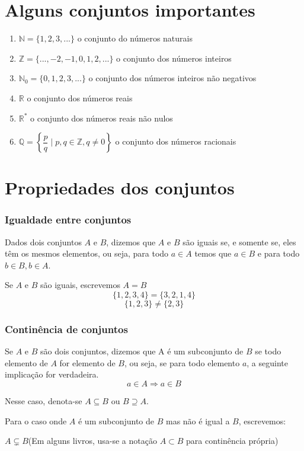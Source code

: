 \section{Alguns conjuntos importantes}
\begin{enumerate}
\item $\mathbb{N}=\{1,2,3,...\}$ o conjunto do n{\'u}meros naturais
\item $\mathbb{Z}=\{...,-2,-1,0,1,2,...\}$ o conjunto dos n{\'u}meros inteiros
\item $\mathbb{N}_{0}=\{0,1,2,3,...\}$ o conjunto dos n{\'u}meros inteiros n{\~a}o negativos
\item $\mathbb{R}$ o conjunto dos n{\'u}meros reais
\item $\mathbb{R}^{*}$ o conjunto dos n{\'u}meros reais n{\~a}o nulos
\item $\mathbb{Q}=\left\{\dfrac{p}{q} \mid p,q \in \mathbb{Z}, q \neq 0 \right\}$ o conjunto dos n{\'u}meros racionais
\end{enumerate}

\section{Propriedades dos conjuntos}

\subsubsection{Igualdade entre conjuntos}

Dados dois conjuntos $A$ e $B$, dizemos que $A$ e $B$ s{\~a}o iguais se, e somente se, eles t{\^e}m os mesmos elementos, ou seja, para todo $a\in A$ temos que $a\in B$ e para todo $b\in B,b\in A$.

Se $A$ e $B$ s{\~a}o iguais, escrevemos $A = B$
\[ \{1,2,3,4\} = \{3,2,1,4\} \]
\[ \{1,2,3\} \neq \{2,3\} \]

\subsubsection{Contin{\^e}ncia de conjuntos}

Se $A$ e $B$ s{\~a}o dois conjuntos, dizemos que A {\'e} um subconjunto de $B$ se todo elemento de $A$ for elemento de $B$, ou seja, se para todo elemento $a$, a seguinte implica{\c c}{\~a}o for verdadeira.
\[ a \in A \Rightarrow a \in B\]

Nesse caso, denota-se $A \subseteq B$ ou $B \supseteq A$.

Para o caso onde $A$ {\'e} um subconjunto de $B$ mas n{\~a}o {\'e} igual a $B$, escrevemos:
\begin{center}
$A \subsetneq B$(Em alguns livros, usa-se a nota{\c c}{\~a}o $A \subset B$ para contin{\^e}ncia pr{\'o}pria)
\end{center}

